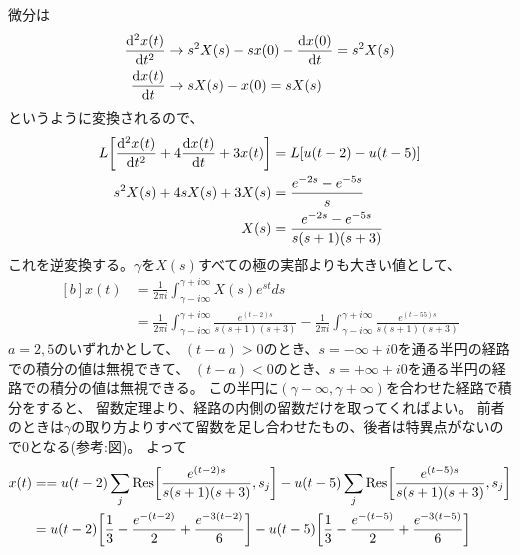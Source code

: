 \documentclass[../ap_2011.tex]{subfiles}
\begin{document}
\subsection{}
微分は
\begin{equation}\begin{aligned}[b]
    \dv[2]{x(t)}{t} &\to s^2X(s)-sx(0)-\dv{x(0)}{t} = s^2X(s)\\
    \dv{x(t)}{t} &\to sX(s)-x(0) = sX(s)
\end{aligned}\end{equation}
というように変換されるので、
\begin{equation}\begin{aligned}[b]
    L\qty[\dv[2]{x(t)}{t}+4\dv{x(t)}{t}+3x(t)]&=L\qty[u(t-2)-u(t-5)]\\
    s^2X(s)+4sX(s)+3X(s) &= \frac{e^{-2s}-e^{-5s}}{s}\\
    X(s) &= \frac{e^{-2s}-e^{-5s}}{s(s+1)(s+3)}\\
\end{aligned}\end{equation}
これを逆変換する。\(\gamma\)を\(X(s)\)すべての極の実部よりも大きい値として、
\begin{equation}\begin{aligned}[b]
    x(t) &= \frac{1}{2\pi i}\int_{\gamma-i\infty}^{\gamma+i\infty}X(s)e^{st}ds\\
    &= \frac{1}{2\pi i}\int_{\gamma-i\infty}^{\gamma+i\infty}\frac{e^{(t-2)s}}{s(s+1)(s+3)}
    -\frac{1}{2\pi i}\int_{\gamma-i\infty}^{\gamma+i\infty}\frac{e^{(t-55)s}}{s(s+1)(s+3)}
\end{aligned}\end{equation}
\(a=2,5\)のいずれかとして、
\((t-a)>0\)のとき、\(s=-\infty+i0\)を通る半円の経路での積分の値は無視できて、
\((t-a)<0\)のとき、\(s=+\infty+i0\)を通る半円の経路での積分の値は無視できる。
この半円に\((\gamma-\infty,\gamma+\infty)\)を合わせた経路で積分をすると、
留数定理より、経路の内側の留数だけを取ってくればよい。
前者のときは\(\gamma\)の取り方よりすべて留数を足し合わせたもの、後者は特異点がないので\(0\)となる(参考:図)。
よって
\begin{equation}\begin{aligned}[b]
    x(t) &== u(t-2)\sum_j\Res[\frac{e^{(t-2)s}}{s(s+1)(s+3)},s_j]-u(t-5)\sum_j\Res[\frac{e^{(t-5)s}}{s(s+1)(s+3)},s_j]\\
    &=u(t-2)\qty[\frac{1}{3}-\frac{e^{-(t-2)}}{2}+\frac{e^{-3(t-2)}}{6}]-u(t-5)\qty[\frac{1}{3}-\frac{e^{-(t-5)}}{2}+\frac{e^{-3(t-5)}}{6}]
\end{aligned}\end{equation}
\end{document}
